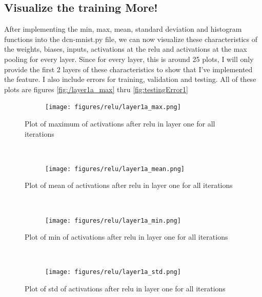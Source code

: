 \documentclass[]{article}
\begin{document}
\subsection{Visualize the training More!}
After implementing the min, max, mean, standard deviation and histogram functions into the dcn-mnist.py file, we can now visualize these characteristics of the weights, biases, inputs, activations at the relu and activations at the max pooling for every layer. Since for every layer, this is around 25 plots, I will only provide the first 2 layers of these characteristics to show that I've implemented the feature. I also include errors for training, validation and testing. All of these plots are figures \ref{fig:/layer1a_max} thru \ref{fig:testingError1}


\begin{figure}[ht]
    \centering
    \begin{subfigure}
        \centering
        \texttt{[image: figures/relu/layer1a\_max.png]}
    \end{subfigure}%
    \caption{Plot of maximum of activations after relu in layer one for all iterations}
 \label{fig:/layer1a_max}
    ~ 
    \centering
    \begin{subfigure}
        \centering
        \texttt{[image: figures/relu/layer1a\_mean.png]}
    \end{subfigure}%
    \caption{Plot of mean of activations after relu in layer one for all iterations}
 \label{fig:/layer1a_mean}
    ~ 
    \centering
    \begin{subfigure}
        \centering
        \texttt{[image: figures/relu/layer1a\_min.png]}
    \end{subfigure}%
    \caption{Plot of min of activations after relu in layer one for all iterations}
 \label{fig:/layer1a_min}
    ~ 
    \centering
    \begin{subfigure}
        \centering
        \texttt{[image: figures/relu/layer1a\_std.png]}
    \end{subfigure}%
    \caption{Plot of std of activations after relu in layer one for all iterations}
 \label{fig:/layer1a_std}
\end{figure}
\end{document}
